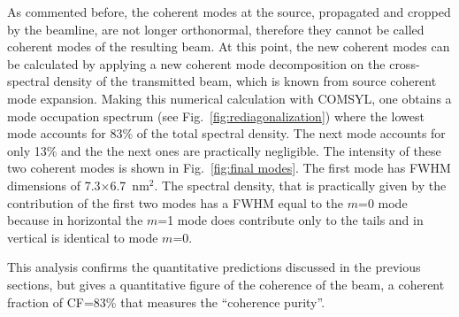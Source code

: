 \documentclass{iucr}              %
\newcommand{\inred}[1]{{\color{black}#1}}
\begin{document}
As commented before, the coherent modes at the source, propagated and cropped by the beamline, are not longer orthonormal, therefore they cannot be called coherent modes of the resulting beam. At this point, the new coherent modes can be calculated by applying a new coherent mode decomposition on the cross-spectral density of the transmitted beam, which is known from source coherent mode expansion. Making this numerical calculation with COMSYL, one obtains a mode occupation spectrum (see Fig.~\ref{fig:rediagonalization}) where the lowest mode accounts for 83\% of the total spectral density. The next mode accounts for only 13\% and the \inred{the next ones are} practically negligible. The intensity of these two coherent modes is shown in Fig.~\ref{fig:final modes}. The first mode has FWHM dimensions of 7.3$\times$6.7~nm$^2$. The spectral density, that is practically given by the contribution of the first two modes has a FWHM equal to the $m$=0 mode because in horizontal the $m$=1 mode does contribute only to the tails and in vertical is identical to mode $m$=0.

This analysis confirms the quantitative predictions discussed in the previous sections, but gives a quantitative figure of the coherence of the beam, a  coherent fraction of CF=83\% that measures the ``coherence purity''.
\end{document}
